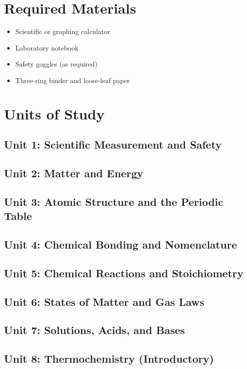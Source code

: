 \documentclass[12pt,oneside]{book}
\begin{document}
\section{Required Materials}
\begin{itemize}[leftmargin=2em]
    \item Scientific or graphing calculator
    \item Laboratory notebook
    \item Safety goggles (as required)
    \item Three-ring binder and loose-leaf paper
\end{itemize}

\section{Units of Study}
\subsection*{Unit 1: Scientific Measurement and Safety}
\subsection*{Unit 2: Matter and Energy}
\subsection*{Unit 3: Atomic Structure and the Periodic Table}
\subsection*{Unit 4: Chemical Bonding and Nomenclature}
\subsection*{Unit 5: Chemical Reactions and Stoichiometry}
\subsection*{Unit 6: States of Matter and Gas Laws}
\subsection*{Unit 7: Solutions, Acids, and Bases}
\subsection*{Unit 8: Thermochemistry (Introductory)}
\end{document}
